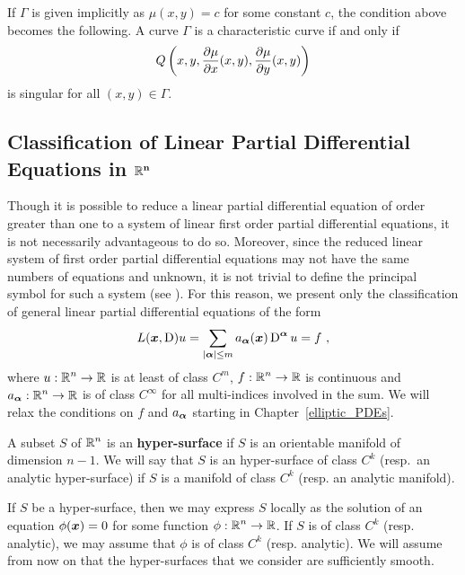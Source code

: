 If $\Gamma$ is given implicitly as $\mu(x,y) = c$ for some constant
$c$, the condition above becomes the following.
A curve $\Gamma$ is a characteristic curve if and only if
\[
Q\left(x,y, \frac{\partial{\mu}}{\partial x}(x,y), \frac{\partial{\mu}}{\partial y}(x,y) \right)
\]
is singular for all $(x,y) \in \Gamma$.

\subsection{Classification of Linear Partial Differential Equations in
$\mathbf{\mathbb{R}^n}$}

Though it is possible to reduce a linear partial differential equation
of order greater than one to a system of linear first order partial
differential equations, it is not necessarily
advantageous to do so.  Moreover, since the reduced linear system of
first order partial differential equations may not have the same
numbers of equations and unknown, it is not trivial to define the
principal symbol for such a system (see \cite{RenRog}).  For this
reason, we present only the
classification of general linear partial differential equations of the form
\begin{equation} \label{classif_gen_class}
L({\bm{x}}, \operatorname{D})u = \sum_{|{\bm{\alpha}}|\leq m} a_{{\bm{\alpha}}}({\bm{x}})
\operatorname{D}^{{\bm{\alpha}}} u = f \ ,
\end{equation}
where $\displaystyle u:\mathbb{R}^n \rightarrow \mathbb{R}$ is at least of class
$\displaystyle C^m$, $\displaystyle f:\mathbb{R}^n \rightarrow \mathbb{R}$ is continuous and
$\displaystyle a_{{\bm{\alpha}}}:\mathbb{R}^n \rightarrow \mathbb{R}$ is of class
$\displaystyle C^\infty$ for all multi-indices involved in the sum.
We will relax the conditions on $f$
and $a_{{\bm{\alpha}}}$ starting in Chapter~\ref{elliptic_PDEs}.

\begin{defn}
A subset $S$ of $\displaystyle \mathbb{R}^n$ is an
{\bfseries hyper-surface} 
if $S$ is an orientable manifold of dimension $n-1$.  We will say that
$S$ is an hyper-surface of class $\displaystyle C^k$ (resp.\ an analytic
hyper-surface) if $S$ is a manifold of class $\displaystyle C^k$
(resp. an analytic manifold).
\end{defn}

If $S$ be a hyper-surface, then we may express $S$ locally as the
solution of an equation $\phi({\bm{x}}) = 0$ for some function
$\displaystyle \phi:\mathbb{R}^n \to \mathbb{R}$.  If $S$ is of class
$\displaystyle C^k$ (resp. analytic), we may assume that
$\phi$ is of class $\displaystyle C^k$ (resp. analytic).  We will
assume from now on that the hyper-surfaces that we consider are
sufficiently smooth.

